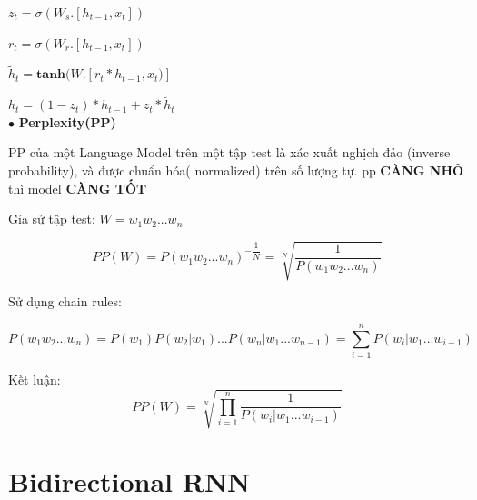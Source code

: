 \documentclass[final,letterpaper,twoside,12pt]{report}
\begin{document}
$z_t = \sigma(W_s. \left[h_{t-1}, x_t\right])$

$r_t = \sigma(W_r. \left[h_{t-1}, x_t\right])$

$\tilde{h}_t = \mathbf{tanh}(W. \left[ r_t \ast h_{t-1}, x_t)\right]$

$h_t = (1- z_t) \ast h_{t-1} + z_t \ast \tilde{h}_t$\\


$\bullet$ \textbf{Perplexity(PP)}

PP của một Language Model trên một tập test là xác xuất nghịch đảo (inverse probability), và được chuẩn hóa( normalized) trên số lượng tự. pp \textbf{\color{red}CÀNG NHỎ} thì model \textbf{\color{red}CÀNG TỐT}

Gỉa sử tập test: $W =w_1w_2...w_n$

$$PP(W)  = P(w_1w_2...w_n)^{-\dfrac{1}{N}} = \sqrt[N]{\dfrac{1}{P(w_1w_2...w_n)}}$$

Sử dụng chain rules:

$$P(w_1w_2...w_n) = P(w_1)P(w_2|w_1)...P(w_n|w_1...w_{n-1}) = \sum_{i=1}^nP(w_i|w_1...w_{i-1}) $$

Kết luận:
$$PP(W) =\sqrt[N]{\prod_{i=1}^n\dfrac{1}{P(w_i|w_1...w_{i-1})}} $$

\section{Bidirectional RNN}
\end{document}
